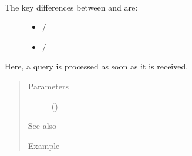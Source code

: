 \documentclass[letterpaper,10pt,english]{sphinxmanual}
\begin{document}
\begin{fulllineitems}
\begin{fulllineitems}
\label{\detokenize{index:Generator.Generator.receive_query}}~\begin{description}
\item[{The key differences between {\hyperref[\detokenize{index:Generator.Generator}]{}} and {\hyperref[\detokenize{index:Generator.GenerationHandler}]{}} are:}] \leavevmode\begin{itemize}
\item {} 
{\hyperref[\detokenize{index:Generator.Generator.receive_query}]{}} / {\hyperref[\detokenize{index:Generator.GenerationHandler.receive_query}]{}}

\item {} 
{\hyperref[\detokenize{index:Generator.Generator.process_query}]{}} / {\hyperref[\detokenize{index:Generator.GenerationHandler.process_query}]{}}

\end{itemize}

\end{description}

Here, a query is processed as soon as it is received.
\begin{quote}\begin{description}
\item[{Parameters}] \leavevmode
{} ({\hyperref[\detokenize{index:Query.Query}]{}}) \textendash{} 

\item[{See also}] \leavevmode
{\hyperref[\detokenize{index:Generator.Generator.process_query}]{}}

\item[{Example}] \leavevmode
\end{description}\end{quote}


\end{fulllineitems}
\end{fulllineitems}
\end{document}
